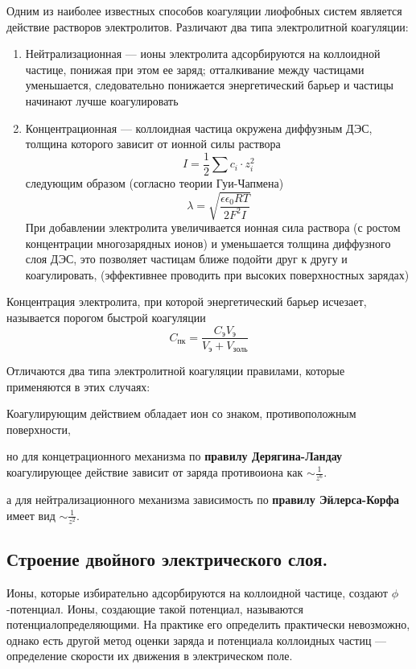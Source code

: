\documentclass[a4paper,12pt]{article}
\begin{document}
Одним из наиболее известных способов коагуляции лиофобных систем является действие растворов электролитов. Различают два типа электролитной коагуляции:
\begin{enumerate}
    \item Нейтрализационная — ионы электролита адсорбируются на коллоидной частице, понижая при этом ее заряд; отталкивание между частицами уменьшается, следовательно понижается энергетический барьер и частицы начинают лучше коагулировать
    \item Концентрационная — коллоидная частица окружена диффузным ДЭС, толщина которого зависит от ионной силы раствора 
    \begin{equation}
        I=\frac{1}{2}\sum c_i\cdot z_{i}^2
    \end{equation}
    следующим образом (согласно теории Гуи-Чапмена) 
    \begin{equation}
        \lambda = \sqrt{\frac{\epsilon \epsilon_0 RT}{2 F^2 I}}
    \end{equation}
    При добавлении электролита увеличивается ионная сила раствора (с ростом концентрации многозарядных ионов) и уменьшается толщина диффузного слоя ДЭС, это позволяет частицам ближе подойти друг к другу и коагулировать, (эффективнее проводить при высоких поверхностных зарядах)
\end{enumerate}

Концентрация электролита, при которой энергетический барьер исчезает, называется порогом быстрой коагуляции 
\begin{equation}
    C_{пк} = \frac{C_{э} V_{э}}{V_{э}+V_{золь}}
\end{equation}

Отличаются два типа электролитной коагуляции правилами, которые применяются в этих случаях:

Коагулирующим действием обладает ион со знаком, противоположным поверхности, 

но для концетрационного механизма по \textbf{правилу Дерягина-Ландау} коагулирующее действие зависит от заряда противоиона как $ \sim \frac{1}{z^6}$. 

а для нейтрализационного механизма зависимость по \textbf{правилу Эйлерса-Корфа} имеет вид $ \sim \frac{1}{z^2}$.
\subsection{Строение двойного электрического слоя.}

Ионы, которые избирательно адсорбируются на коллоидной частице, создают $\phi$-потенциал. Ионы, создающие такой потенциал, называются потенциалопределяющими. На практике его определить практически невозможно, однако есть другой метод оценки заряда и потенциала коллоидных частиц — определение скорости их движения в электрическом поле. 
\end{document}
